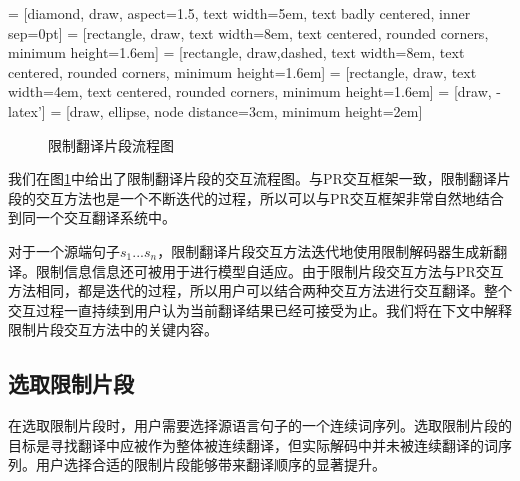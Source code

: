 \documentclass[master, winfont]{njuthesis}
\begin{document}
 = [diamond, draw, aspect=1.5,
    text width=5em, text badly centered, inner sep=0pt]
 = [rectangle, draw,
    text width=8em, text centered, rounded corners, minimum height=1.6em]
 = [rectangle, draw,dashed,
    text width=8em, text centered, rounded corners, minimum height=1.6em]
 = [rectangle, draw, text width=4em, text centered, rounded corners, minimum height=1.6em]
 = [draw, -latex']  = [draw, ellipse, node distance=3cm,
    minimum height=2em]
\begin {figure}[ht]
\centering
{}
\caption {\label{figure:spanFlow} 限制翻译片段流程图}
\end{figure}

我们在图\ref{figure:spanFlow}中给出了限制翻译片段的交互流程图。与PR交互框架一致，限制翻译片段的交互方法也是一个不断迭代的过程，所以可以与PR交互框架非常自然地结合到同一个交互翻译系统中。

对于一个源端句子$s_1...s_n$，限制翻译片段交互方法迭代地使用限制解码器生成新翻译。限制信息信息还可被用于进行模型自适应。由于限制片段交互方法与PR交互方法相同，都是迭代的过程，所以用户可以结合两种交互方法进行交互翻译。整个交互过程一直持续到用户认为当前翻译结果已经可接受为止。我们将在下文中解释限制片段交互方法中的关键内容。
\subsection{选取限制片段}
\label{section:chosespan}
在选取限制片段时，用户需要选择源语言句子的一个连续词序列。选取限制片段的目标是寻找翻译中应被作为整体被连续翻译，但实际解码中并未被连续翻译的词序列。用户选择合适的限制片段能够带来翻译顺序的显著提升。
\end{document}
